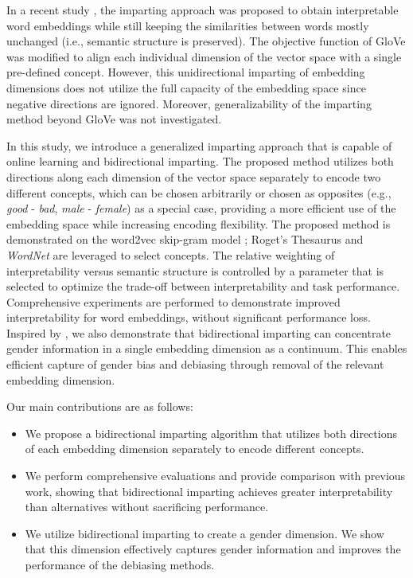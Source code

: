 \documentclass[11pt,a4paper]{article}
\begin{document}
In a recent study  \citep{senel20impart}, the imparting approach was proposed to obtain
interpretable word embeddings while still keeping
the similarities between words mostly unchanged (i.e., semantic structure is preserved). The
objective function of GloVe 
\citep{pennington14glove} was modified to align each
individual dimension of the vector space with a single
pre-defined concept. However, this unidirectional imparting
of embedding dimensions does not utilize the full capacity
of the embedding space since negative directions are
ignored. Moreover, generalizability of the imparting method
beyond GloVe  was not
investigated. 

In this study, we introduce a generalized imparting approach that is capable of online learning and bidirectional imparting. 
The proposed method utilizes both directions along each dimension of the vector space separately to encode two different concepts, which can be chosen arbitrarily or chosen as opposites (e.g., \textit{good} - \textit{bad}, \textit{male} - \textit{female}) as a special case, providing a more efficient use of the embedding space while increasing encoding flexibility. 
The proposed method is demonstrated on the word2vec skip-gram model \citep{mikolov13word2vec_a,mikolov13word2vec_b}; Roget's Thesaurus and \textit{WordNet} are leveraged to select concepts. 
The relative weighting of interpretability versus semantic structure is controlled by a parameter that is selected to optimize the trade-off between interpretability and task performance. 
Comprehensive experiments are performed to demonstrate improved interpretability for word embeddings, without significant performance loss. 
Inspired by  \citep{bolukbasi16debiasing}, we also demonstrate that bidirectional imparting can concentrate gender information in a single embedding dimension as a continuum. 
This enables efficient capture of gender bias and debiasing through removal of the relevant embedding dimension. 

Our main contributions are as follows:
\begin{itemize}
    \item We propose a bidirectional imparting algorithm that utilizes both directions of each embedding dimension separately to encode different concepts.
    
    \item We perform comprehensive evaluations and provide comparison with  previous work, showing that bidirectional imparting achieves greater interpretability than alternatives without sacrificing performance. 
    
    \item We utilize bidirectional imparting to create a gender dimension. We show that this dimension effectively captures gender information and improves the performance of the debiasing methods.
\end{itemize}
\end{document}
